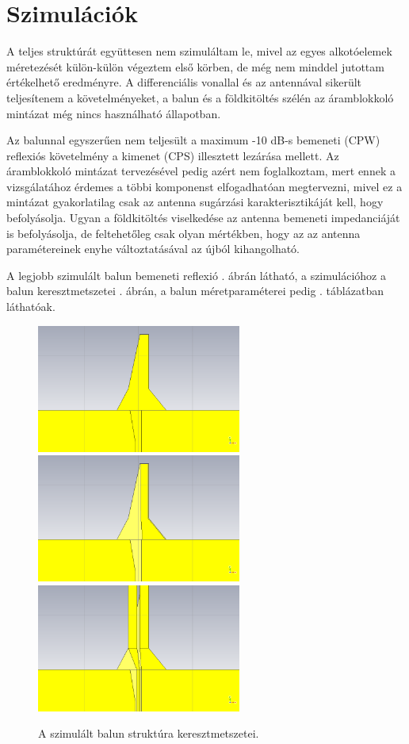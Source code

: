 \chapter{Szimulációk}
A teljes struktúrát együttesen nem szimuláltam le, mivel az egyes alkotóelemek méretezését külön-külön végeztem első körben, de még nem minddel jutottam értékelhető eredményre. A differenciális vonallal és az antennával sikerült teljesítenem a követelményeket, a balun és a földkitöltés szélén az áramblokkoló mintázat még nincs használható állapotban.
\par Az balunnal egyszerűen nem teljesült a maximum -10 dB-s bemeneti (CPW) reflexiós követelmény a kimenet (CPS) illesztett lezárása mellett. Az áramblokkoló mintázat tervezésével pedig azért nem foglalkoztam, mert ennek a vizsgálatához érdemes a többi komponenst elfogadhatóan megtervezni, mivel ez a mintázat gyakorlatilag csak az antenna sugárzási karakterisztikáját kell, hogy befolyásolja. Ugyan a földkitöltés viselkedése az antenna bemeneti impedanciáját is befolyásolja, de feltehetőleg csak olyan mértékben, hogy az az antenna paramétereinek enyhe változtatásával az újból kihangolható.
\par A legjobb szimulált balun bemeneti reflexió . ábrán látható, a szimulációhoz a balun keresztmetszetei . ábrán, a balun méretparaméterei pedig . táblázatban láthatóak.
\begin{figure}[h]
	\centering
	\includegraphics[width=0.6\textwidth]{kep/results/balun_1.bmp}
	\includegraphics[width=0.6\textwidth]{kep/results/balun_2.bmp}
	\includegraphics[width=0.6\textwidth]{kep/results/balun_3.bmp}
	\caption{A szimulált balun struktúra keresztmetszetei.}
	\label{fig:balun-kereszt}
\end{figure}
